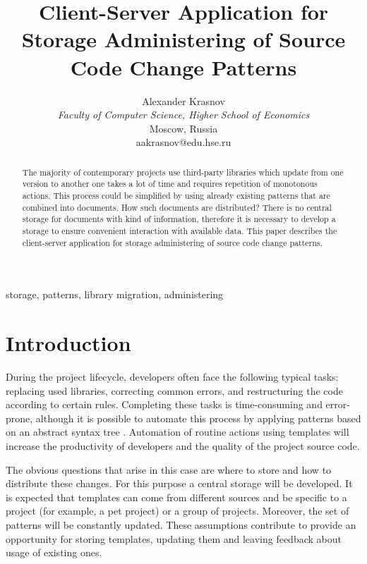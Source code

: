 \documentclass[letterpaper, 10 pt, conference]{ieeeconf}  %
\title{\LARGE \bf
Client-Server Application for Storage Administering of Source Code Change Patterns
}
\author{
Alexander Krasnov \\ 
\textit{Faculty of Computer Science, Higher School of Economics} \\
Moscow, Russia \\
aakrasnov@edu.hse.ru
}
\begin{document}
\maketitle
\thispagestyle{empty}
\pagestyle{empty}


\begin{abstract}

The majority of contemporary projects use third-party libraries which update from one version to another one takes a lot of time and requires repetition of monotonous actions. This process could be simplified by using already existing patterns that are combined into documents. How such documents are distributed? There is no central storage for documents with kind of information, therefore it is necessary to develop a storage to ensure convenient interaction with available data. This paper describes the client-server application for storage administering of source code change patterns.

\end{abstract}

\begin{keywords} 
storage, patterns, library migration, administering
\end{keywords}


\section{Introduction}
During the project lifecycle, developers often face the following
typical tasks: replacing used libraries, correcting common errors,
and restructuring the code according to certain rules. Completing
these tasks is time-consuming and error-prone, although it is
possible to automate this process by applying patterns based on an
abstract syntax tree \cite{c1}. Automation of routine actions using
templates will increase the productivity of developers and the quality of
the project source code.

The obvious questions that arise in this case are where to store and
how to distribute these changes. For this purpose a central storage
will be developed. It is expected that templates can come from
different sources and be specific to a project (for example, a pet
project) or a group of projects. Moreover, the set of patterns will
be constantly updated. These assumptions contribute to provide an
opportunity for storing templates, updating them and leaving feedback about
usage of existing ones.
\end{document}
